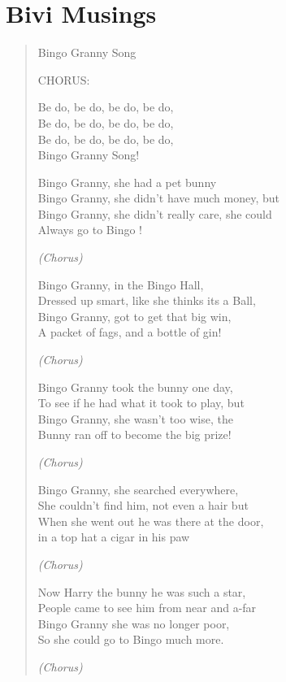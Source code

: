 
\section{Bivi Musings}


\begin{verse}
\begin{centering}
Bingo Granny Song

CHORUS:

Be do, be do, be do, be do, \\
Be do, be do, be do, be do, \\
Be do, be do, be do, be do, \\
Bingo Granny Song!

Bingo    Granny,   she   had     a    pet    bunny  \\
Bingo    Granny,   she   didn't have   much    money,   but \\
Bingo    Granny,   she   didn't  really     care,       she could \\
Always go to  Bingo ! 

\emph{(Chorus)}

Bingo    Granny,     in      the Bingo      Hall, \\
Dressed up smart, like   she  thinks   its    a      Ball, \\
Bingo    Granny,    got    to    get        that  big   win, \\
A  packet of fags,  and   a     bottle of gin!


\emph{(Chorus)}

Bingo Granny took the bunny one day, \\
To see if he had what it took to play, but \\
Bingo Granny, she wasn't too wise, the \\
Bunny ran off to become the big prize!

\emph{(Chorus)}

Bingo Granny, she searched everywhere, \\
She couldn't find him, not even a hair but \\
When she went out he was there at the door, \\
in a top hat a cigar in his paw

\emph{(Chorus)}

Now Harry the bunny he was such a star, \\
People came to see him from near and a-far \\
Bingo Granny she was no longer poor, \\
So she could go to Bingo much more.

\emph{(Chorus)}

\end{centering}
\end{verse}

